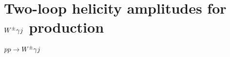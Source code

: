 \documentclass[main.tex]{subfiles}
\begin{document}
\chapter{Two-loop helicity amplitudes for $W^\pm \gamma j$ production}
$pp \rightarrow W^\pm \gamma j$
\end{document}

